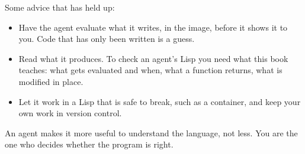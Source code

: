 Some advice that has held up:

\begin{itemize}
\item Have the agent evaluate what it writes, in the image, before it
shows it to you. Code that has only been written is a guess.

\item Read what it produces. To check an agent's Lisp you need what
this book teaches: what gets evaluated and when, what a function
returns, what is modified in place.

\item Let it work in a Lisp that is safe to break, such as a
container, and keep your own work in version control.
\end{itemize}

An agent makes it more useful to understand the language, not less.
You are the one who decides whether the program is right.
